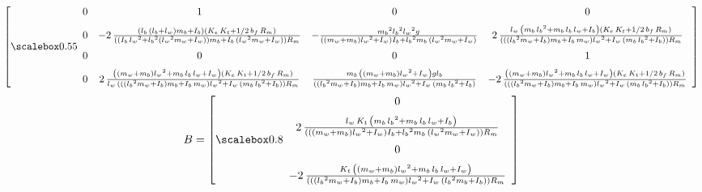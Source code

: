 \documentclass[11pt]{article}
\begin{document}
\[
\left[ \scalemath{0.55}{ \begin {array}{cccc} 0&1&0&0\\ \noalign{\medskip}0&-2\,{\frac 
{ \left( l_{b}\, \left( l_{b}+l_{w} \right) m_{b}+I_{b} \right) 
 \left( K_{e}\,K_{t}+1/2\,b_{f}\,R_{m} \right) }{ \left(  \left( I_{b}
\,{l_{w}}^{2}+{l_{b}}^{2} \left( {l_{w}}^{2}m_{w}+I_{w} \right) 
 \right) m_{b}+I_{b}\, \left( {l_{w}}^{2}m_{w}+I_{w} \right)  \right) 
R_{m}}}&-{\frac {{m_{b}}^{2}{l_{b}}^{2}{l_{w}}^{2}g}{ \left(  \left( m
_{w}+m_{b} \right) {l_{w}}^{2}+I_{w} \right) I_{b}+{l_{b}}^{2}m_{b}\,
 \left( {l_{w}}^{2}m_{w}+I_{w} \right) }}&2\,{\frac {l_{w}\, \left( m_
{b}\,{l_{b}}^{2}+m_{b}\,l_{b}\,l_{w}+I_{b} \right)  \left( K_{e}\,K_{t
}+1/2\,b_{f}\,R_{m} \right) }{ \left(  \left(  \left( {l_{b}}^{2}m_{w}
+I_{b} \right) m_{b}+I_{b}\,m_{w} \right) {l_{w}}^{2}+I_{w}\, \left( m
_{b}\,{l_{b}}^{2}+I_{b} \right)  \right) R_{m}}}\\ \noalign{\medskip}0
&0&0&1\\ \noalign{\medskip}0&2\,{\frac { \left(  \left( m_{w}+m_{b}
 \right) {l_{w}}^{2}+m_{b}\,l_{b}\,l_{w}+I_{w} \right)  \left( K_{e}\,
K_{t}+1/2\,b_{f}\,R_{m} \right) }{l_{w}\, \left(  \left(  \left( {l_{b
}}^{2}m_{w}+I_{b} \right) m_{b}+I_{b}\,m_{w} \right) {l_{w}}^{2}+I_{w}
\, \left( m_{b}\,{l_{b}}^{2}+I_{b} \right)  \right) R_{m}}}&{\frac {m_
{b}\, \left(  \left( m_{w}+m_{b} \right) {l_{w}}^{2}+I_{w} \right) gl_
{b}}{ \left(  \left( {l_{b}}^{2}m_{w}+I_{b} \right) m_{b}+I_{b}\,m_{w}
 \right) {l_{w}}^{2}+I_{w}\, \left( m_{b}\,{l_{b}}^{2}+I_{b} \right) }
}&-2\,{\frac { \left(  \left( m_{w}+m_{b} \right) {l_{w}}^{2}+m_{b}\,l
_{b}\,l_{w}+I_{w} \right)  \left( K_{e}\,K_{t}+1/2\,b_{f}\,R_{m}
 \right) }{ \left(  \left(  \left( {l_{b}}^{2}m_{w}+I_{b} \right) m_{b
}+I_{b}\,m_{w} \right) {l_{w}}^{2}+I_{w}\, \left( m_{b}\,{l_{b}}^{2}+I
_{b} \right)  \right) R_{m}}}\end {array}} \right]\]
\medskip
\medskip
\medskip
\medskip
\begin{equation*}
B = 
\left[ \scalemath{0.8}{\begin {array}{c} 0\\ \noalign{\medskip}2\,{\frac {l_{w}\,K_{t
}\, \left( m_{b}\,{l_{b}}^{2}+m_{b}\,l_{b}\,l_{w}+I_{b} \right) }{
 \left(  \left(  \left( m_{w}+m_{b} \right) {l_{w}}^{2}+I_{w} \right) 
I_{b}+{l_{b}}^{2}m_{b}\, \left( {l_{w}}^{2}m_{w}+I_{w} \right) 
 \right) R_{m}}}\\ \noalign{\medskip}0\\ \noalign{\medskip}-2\,{\frac 
{K_{t}\, \left(  \left( m_{w}+m_{b} \right) {l_{w}}^{2}+m_{b}\,l_{b}\,
l_{w}+I_{w} \right) }{ \left(  \left(  \left( {l_{b}}^{2}m_{w}+I_{b}
 \right) m_{b}+I_{b}\,m_{w} \right) {l_{w}}^{2}+I_{w}\, \left( {l_{b}}
^{2}m_{b}+I_{b} \right)  \right) R_{m}}}\end {array}} \right]
\end{equation*}
\end{document}
